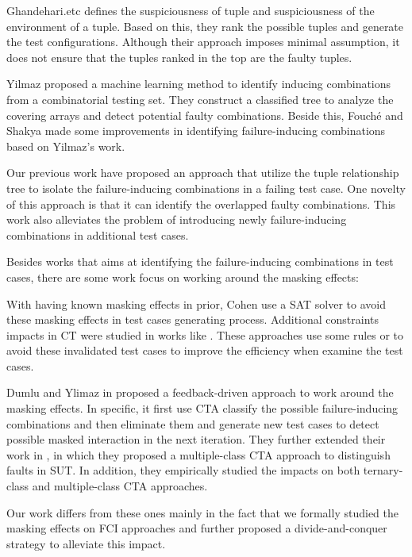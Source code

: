 \documentclass{sig-alternate}
\begin{document}
Ghandehari.etc \cite{ghandehari2012identifying} defines the suspiciousness of tuple and suspiciousness of the environment of a tuple. Based on this, they rank the possible tuples and generate the test configurations. Although their approach imposes minimal assumption, it does not ensure that the tuples ranked in the top are the faulty tuples.

Yilmaz \cite{yilmaz2006covering} proposed a machine learning method to identify inducing combinations from a combinatorial testing set. They construct a classified tree to analyze the covering arrays and detect potential faulty combinations. Beside this, Fouché \cite{fouche2009incremental} and Shakya \cite{shakya2012isolating} made some improvements in identifying failure-inducing combinations based on Yilmaz's work.

Our previous work \cite{niu2013identifying} have proposed an approach that utilize the tuple relationship tree to isolate the failure-inducing combinations in a failing test case. One novelty of this approach is that it can identify the overlapped faulty combinations. This work also alleviates the problem of introducing newly failure-inducing combinations in additional test cases.

Besides works that aims at identifying the failure-inducing combinations in test cases, there are some work focus on working around the masking effects:

With having known masking effects in prior, Cohen \cite{cohen2008constructing} use a SAT solver to avoid these masking effects in test cases generating process. Additional constraints impacts in CT were studied in works like \cite{bryce2006prioritized,chen2010combinatorial,calvagna2008logic,grindal2006handling,yilmaz2013test}. These approaches use some rules or to avoid these invalidated test cases to improve the efficiency when examine the test cases.

Dumlu and Ylimaz in \cite{dumlu2011feedback} proposed a feedback-driven approach to work around the masking effects. In specific, it first use CTA classify the possible failure-inducing combinations and then eliminate them and generate new test cases to detect possible masked interaction in the next iteration. They further extended their work in \cite{yilmaz2013reducing}, in which they proposed a multiple-class CTA approach to distinguish faults in SUT. In addition, they empirically studied the impacts on both ternary-class and multiple-class CTA approaches.

Our work differs from these ones mainly in the fact that we formally studied the masking effects on FCI approaches and further proposed a divide-and-conquer strategy to alleviate this impact.
\end{document}
